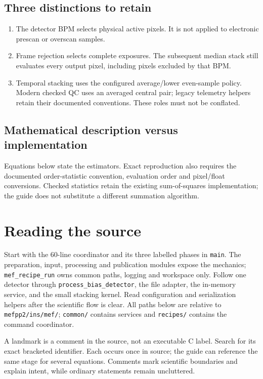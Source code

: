 \documentclass[11pt,a4paper]{article}
\newcommand{\code}[1]{\nolinkurl{#1}}
\begin{document}
\subsection*{Three distinctions to retain}
\begin{enumerate}
\item The detector BPM selects physical active pixels. It is not applied to
electronic prescan or overscan samples.
\item Frame rejection selects complete exposures. The subsequent median stack
still evaluates every output pixel, including pixels excluded by that BPM.
\item Temporal stacking uses the configured average/lower even-sample policy.
Modern checked QC uses an averaged central pair; legacy telemetry helpers
retain their documented conventions. These roles must not be conflated.
\end{enumerate}
\subsection*{Mathematical description versus implementation}
Equations below state the estimators. Exact reproduction also requires the
documented order-statistic convention, evaluation order and pixel/float
conversions. Checked statistics retain the existing sum-of-squares
implementation; the guide does not substitute a different summation algorithm.


\newpage
\section*{Reading the source}\label{sec:source-reading}
Start with the 60-line coordinator and its three labelled phases in \code{main}.
The preparation, input, processing and publication modules expose the mechanics;
\code{mef_recipe_run} owns common paths, logging and workspace only. Follow one detector
through \code{process_bias_detector}, the file adapter, the in-memory service,
and the small stacking kernel. Read configuration and serialization helpers
after the scientific flow is clear. All paths below are relative to
\code{mefpp2/ins/mef/}; \code{common/} contains services and
\code{recipes/} contains the command coordinator.

A landmark is a comment in the source, not an executable C label. Search for
its exact bracketed identifier. Each occurs once in source; the guide can
reference the same stage for several equations. Comments mark scientific
boundaries and explain intent, while ordinary statements remain uncluttered.
\end{document}
